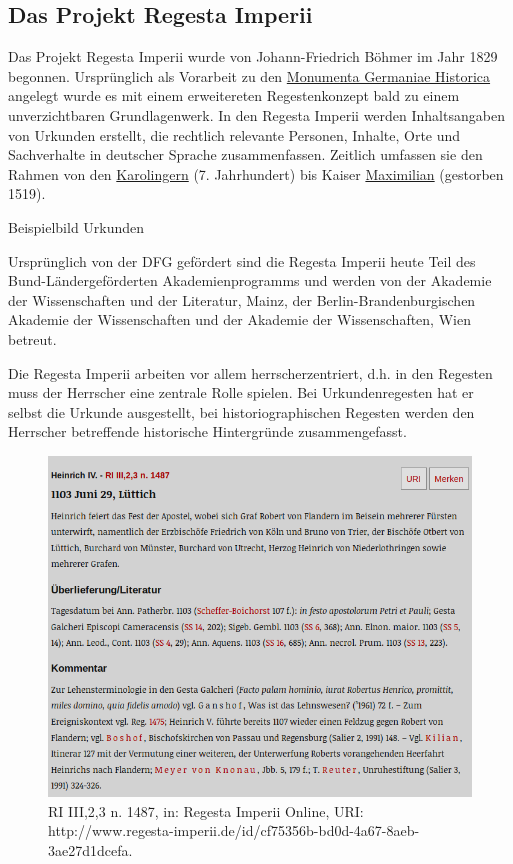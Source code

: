 \documentclass[12pt,ngerman,]{article}
\begin{document}
\subsection{Das Projekt Regesta
Imperii}\label{das-projekt-regesta-imperii}

Das Projekt Regesta Imperii wurde von Johann-Friedrich Böhmer im Jahr
1829 begonnen. Ursprünglich als Vorarbeit zu den
\href{https://www.mgh.de}{Monumenta Germaniae Historica} angelegt wurde
es mit einem erweitereten Regestenkonzept bald zu einem unverzichtbaren
Grundlagenwerk. In den Regesta Imperii werden Inhaltsangaben von
Urkunden erstellt, die rechtlich relevante Personen, Inhalte, Orte und
Sachverhalte in deutscher Sprache zusammenfassen. Zeitlich umfassen sie
den Rahmen von den
\href{https://de.wikipedia.org/wiki/Karolinger}{Karolingern} (7.
Jahrhundert) bis Kaiser
\href{https://de.wikipedia.org/wiki/Maximilian_I._(HRR)}{Maximilian}
(gestorben 1519).

Beispielbild Urkunden

Ursprünglich von der DFG gefördert sind die Regesta Imperii heute Teil
des Bund-Ländergeförderten Akademienprogramms und werden von der
Akademie der Wissenschaften und der Literatur, Mainz, der
Berlin-Brandenburgischen Akademie der Wissenschaften und der Akademie
der Wissenschaften, Wien betreut.

Die Regesta Imperii arbeiten vor allem herrscherzentriert, d.h. in den
Regesten muss der Herrscher eine zentrale Rolle spielen. Bei
Urkundenregesten hat er selbst die Urkunde ausgestellt, bei
historiographischen Regesten werden den Herrscher betreffende
historische Hintergründe zusammengefasst.

\begin{figure}
\centering
\includegraphics{Bilder/RI2Graph/ReggH4-Nr-1487.png}
\caption{RI III,2,3 n. 1487, in: Regesta Imperii Online, URI:
http://www.regesta-imperii.de/id/cf75356b-bd0d-4a67-8aeb-3ae27d1dcefa.}
\end{figure}
\end{document}
